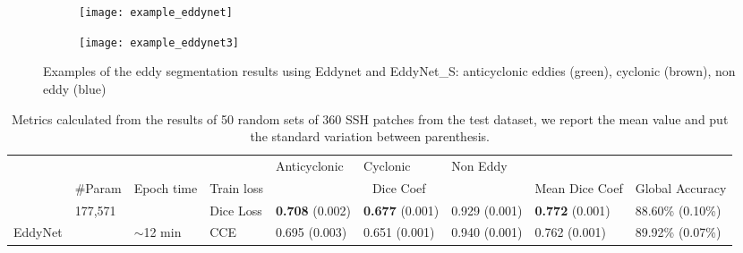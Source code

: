 \documentclass[journal]{IEEEtran}
\begin{document}
\begin{figure}
    \centering
    \begin{subfigure}[b]{0.3\textwidth}
       \centering \texttt{[image: example\_eddynet]}
       \caption{}\label{fig:example1}
    \end{subfigure}
\begin{subfigure}[b]{0.3\textwidth}
       \centering 
       \texttt{[image: example\_eddynet3]}
       \caption{}\label{fig:example2}
    \end{subfigure}
\caption{Examples of the eddy segmentation results using Eddynet and EddyNet\_S: anticyclonic eddies (green), cyclonic (brown), non eddy (blue)}
\label{fig:exampleeddynet}
\end{figure}

\begin{table*}[t]
\centering
\caption{Metrics calculated from the results of 50 random sets of 360 SSH patches from the test dataset, we report the mean value and put the standard variation between parenthesis.}
\label{tab:eddynet_results}
\begin{tabular}{llll|l|l|l|ll}
\cline{5-7}
                                                        &                                         &                                         &                                        & Anticyclonic             & Cyclonic                 & Non Eddy                 &                                               &                                               \\ \cline{2-9} 
\multicolumn{1}{l|}{}                                   & \multicolumn{1}{l|}{\#Param}       & \multicolumn{1}{l|}{Epoch time}     & Train loss                          & \multicolumn{3}{c|}{Dice Coef}                                                & \multicolumn{1}{l|}{Mean Dice Coef}          & \multicolumn{1}{l|}{Global Accuracy}          \\ \hline
\multicolumn{1}{|l|}{}                                  & \multicolumn{1}{l|}{177,571}                   & \multicolumn{1}{l|}{}                   & \cellcolor[HTML]{FFCE93}Dice Loss      & \cellcolor[HTML]{FFCE93}\textbf{0.708} (0.002) & \cellcolor[HTML]{FFCE93}\textbf{0.677} (0.001) & \cellcolor[HTML]{FFCE93}0.929 (0.001) & \multicolumn{1}{l|}{\cellcolor[HTML]{FFCE93}\textbf{0.772 }(0.001)} & \multicolumn{1}{l|}{\cellcolor[HTML]{FFCE93}88.60\% (0.10\%)} \\ \cline{4-9} 
\multicolumn{1}{|l|}{\multirow{-2}{*}{EddyNet}} & \multicolumn{1}{l|}{}                   & \multicolumn{1}{l|}{\multirow{-2}{*}{$\sim$12 min}} & \cellcolor[HTML]{FFFFC7}CCE & \cellcolor[HTML]{FFFFC7}0.695 (0.003) & \cellcolor[HTML]{FFFFC7}0.651 (0.001) & \cellcolor[HTML]{FFFFC7}0.940 (0.001) & \multicolumn{1}{l|}{\cellcolor[HTML]{FFFFC7}0.762 (0.001)} & \multicolumn{1}{l|}{\cellcolor[HTML]{FFFFC7}89.92\% (0.07\%)} \\ \cline{1-1} \cline{3-9} 

\end{tabular}
\end{table*}
\end{document}
